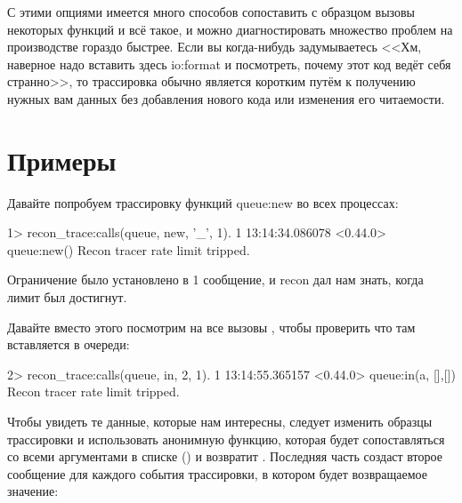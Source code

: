 С этими опциями имеется много способов сопоставить с образцом вызовы некоторых функций и всё такое, и можно диагностировать множество проблем на производстве гораздо быстрее. Если вы когда-нибудь задумываетесь <<Хм, наверное надо вставить здесь io:format и посмотреть, почему этот код ведёт себя странно>>, то трассировка обычно является коротким путём к получению нужных вам данных без добавления нового кода или изменения его читаемости.


\section{Примеры}

Давайте попробуем трассировку функций queue:new во всех процессах:

\begin{VerbatimEshell}
1> recon_trace:calls({queue, new, '_'}, 1).
1
13:14:34.086078 <0.44.0> queue:new()
Recon tracer rate limit tripped.
\end{VerbatimEshell}

Ограничение было установлено в 1 сообщение, и recon дал нам знать, когда лимит был достигнут.

Давайте вместо этого посмотрим на все вызовы , чтобы проверить что там вставляется в очереди:

\begin{VerbatimEshell}
2> recon_trace:calls({queue, in, 2}, 1).
1
13:14:55.365157 <0.44.0> queue:in(a, {[],[]})
Recon tracer rate limit tripped.
\end{VerbatimEshell}

Чтобы увидеть те данные, которые нам интересны, следует изменить образцы трассировки и использовать анонимную функцию, которая будет сопоставляться со всеми аргументами в списке (\term{\_}) и возвратит . Последняя часть создаст второе сообщение для каждого события трассировки, в котором будет возвращаемое значение:


